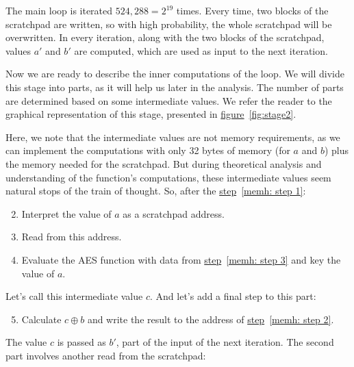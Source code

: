\begin{tcolorbox}[colback=yellow!5!white,colframe=yellow!65!black,title=\emph{Clarification 2:}]
  The main loop is iterated $524,288 = 2^{19}$ times. Every time, two blocks of the scratchpad are written, so with high probability, the whole scratchpad will be overwritten. In every iteration, along with the two blocks of the scratchpad, values $a'$ and $b'$ are computed, which are used as input to the next iteration.
\end{tcolorbox}
\vspace{0.2cm}

Now we are ready to describe the inner computations of the loop. We will divide this stage into parts, as it will help us later in the analysis. The number of parts are determined based on some intermediate values. We refer the reader to the graphical representation of this stage, presented in \hyperref[fig:stage2]{figure}~\ref{fig:stage2}.

Here, we note that the intermediate values are not memory requirements, as we can implement the computations with only 32 bytes of memory (for $a$ and $b$) plus the memory needed for the scratchpad. But during theoretical analysis and understanding of the function's computations, these intermediate values seem natural stops of the train of thought. So, after the \hyperref[memh: step 1]{step}~\ref{memh: step 1}:

\begin{enumerate}
  \setcounter{enumi}{1}
  \item \label{memh: step 2} Interpret the value of $a$ as a scratchpad address.
  \item \label{memh: step 3} Read from this address.
  \item Evaluate the AES function with data from \hyperref[memh: step 3]{step}~\ref{memh: step 3} and key the value of $a$.
\end{enumerate}
Let's call this intermediate value $c$. And let's add a final step to this part:
\begin{enumerate}
  \setcounter{enumi}{4}
  \item Calculate $c \oplus b$ and write the result to the address of \hyperref[memh: step 2]{step}~\ref{memh: step 2}.
\end{enumerate}
The value $c$ is passed as $b'$, part of the input of the next iteration. The second part involves another read from the scratchpad:

